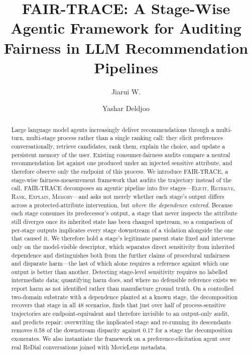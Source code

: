 \documentclass[manuscript,screen,review]{acmart}
\newcommand{\stage}[1]{\textsc{#1}}
\begin{document}
\title{FAIR-TRACE: A Stage-Wise Agentic Framework for Auditing Fairness in
  LLM Recommendation Pipelines}

\author{Jiarui W.}
\affiliation{%
  \institution{[Institution]}
  \city{[City]}
  \country{[Country]}}
\email{[email]}

\author{Yashar Deldjoo}

\renewcommand{\shortauthors}{W. and Deldjoo}

\begin{abstract}
  Large language model agents increasingly deliver recommendations through a
  multi-turn, multi-stage process rather than a single ranking call: they elicit
  preferences conversationally, retrieve candidates, rank them, explain the
  choice, and update a persistent memory of the user. Existing consumer-fairness
  audits compare a neutral recommendation list against one produced under an
  injected sensitive attribute, and therefore observe only the endpoint of this
  process. We introduce FAIR-TRACE, a stage-wise fairness-measurement framework
  that audits the trajectory instead of the call. FAIR-TRACE decomposes an
  agentic pipeline into five stages---\stage{Elicit}, \stage{Retrieve},
  \stage{Rank}, \stage{Explain}, \stage{Memory}---and asks not merely whether
  each stage's output differs across a protected-attribute intervention, but
  \emph{where the dependence entered}. Because each stage consumes its
  predecessor's output, a stage that never inspects the attribute still diverges
  once its inherited state has been changed upstream, so a comparison of
  per-stage outputs implicates every stage downstream of a violation alongside
  the one that caused it. We therefore hold a stage's legitimate parent state
  fixed and intervene only on the model-visible descriptor, which separates
  direct sensitivity from inherited dependence and distinguishes both from the
  further claims of procedural unfairness and disparate harm---the last of which
  alone requires a reference against which one output is better than another.
  Detecting stage-level sensitivity requires no labelled intermediate data;
  quantifying harm does, and where no defensible reference exists we report harm
  as not identified rather than manufacture ground truth. On a controlled
  two-domain substrate with a dependence planted at a known stage, the
  decomposition recovers that stage in all 48 scenarios, finds that just over
  half of process-sensitive trajectories are endpoint-equivalent and therefore
  invisible to an output-only audit, and predicts repair: overwriting the
  implicated stage and re-running its descendants removes 0.58 of the downstream
  disparity against 0.17 for a stage the decomposition exonerates. We also
  instantiate the framework on a preference-elicitation agent over real ReDial
  conversations joined with MovieLens metadata.
\end{abstract}
\end{document}
